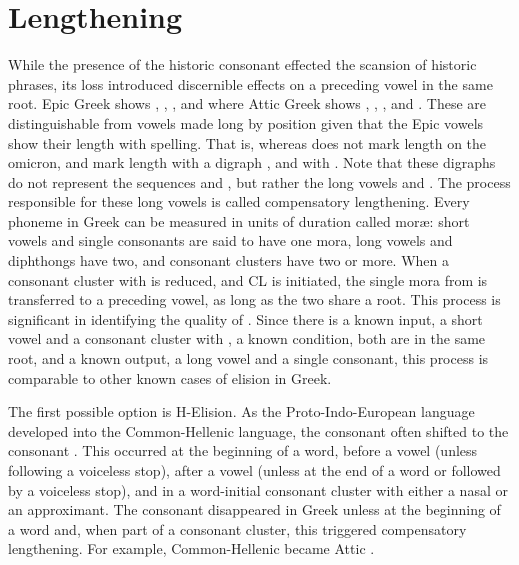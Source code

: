 \section{Lengthening}\label{sec:Lengthening}
While the presence of the historic consonant \greek{*\w} effected the scansion of historic phrases, its loss introduced discernible effects on a preceding vowel in the same root. Epic Greek shows , , , and  where Attic Greek shows , , , and . These are distinguishable from vowels made long by position given that the Epic vowels show their length with spelling. That is, whereas  does not mark length on the omicron,  and  mark length with a digraph , and  with . Note that these digraphs do not represent the sequences  and , but rather the long vowels  and . The process responsible for these long vowels is called compensatory lengthening. Every phoneme in Greek can be measured in units of duration called mor\ae: short vowels and single consonants are said to have one mora, long vowels and diphthongs have two, and consonant clusters have two or more. When a consonant cluster with \greek{*\w} is reduced, and CL is initiated, the single mora from \greek{*\w} is transferred to a preceding vowel, as long as the two share a root. This process is significant in identifying the quality of \greek{*\w}. Since there is a known input, a short vowel and a consonant cluster with \greek{*\w},  a known condition, both are in the same root, and a known output, a long vowel and a single consonant, this process is comparable to other known cases of elision in Greek.



The first possible option is H-Elision. As the Proto-Indo-European language developed into the Common-Hellenic language, the consonant  often shifted to the consonant . This occurred at the beginning of a word, before a vowel (unless following a voiceless stop), after a vowel (unless at the end of a word or followed by a voiceless stop), and in a word-initial consonant cluster with either a nasal or an approximant.\autocite[168-172]{Smyth_2013}  The consonant  disappeared in Greek unless at the beginning of a word and, when part of a consonant cluster, this triggered compensatory lengthening. For example, Common-Hellenic  became Attic .\autocite[]{Beekes_2009}

